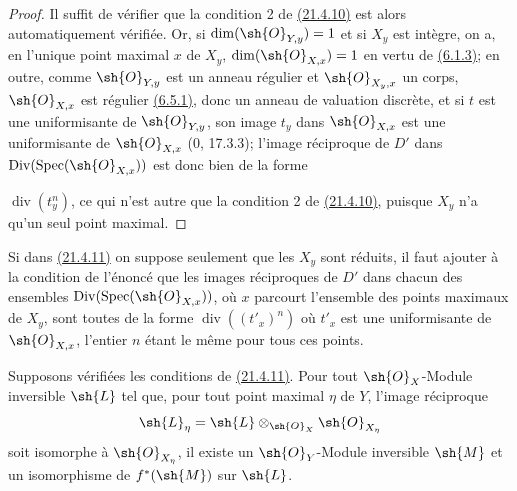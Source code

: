 \begin{proof}
Il suffit de vérifier que la condition 2\textdegree{} de
{\hyperlink{ega4.c04.cor.21-4-10}{(21.4.10)}} est alors
automatiquement vérifiée. Or, si $\dim(\sh{O}_{Y,y})=1$ et si $X_y$ est
intègre, on a, en l'unique point maximal $x$ de $X_y$,
$\dim(\sh{O}_{X,x})=1$ en vertu de
{\hyperlink{ega4.c04.cor.6-1-3}{(6.1.3)}}; en outre, comme
$\sh{O}_{Y,y}$ est un anneau régulier et $\sh{O}_{X_y,x}$ un corps,
$\sh{O}_{X,x}$ est régulier
{\hyperlink{ega4.c04.prop.6-5-1}{(6.5.1)}}, donc un anneau de valuation
discrète, et si $t$ est une uniformisante de $\sh{O}_{Y,y}$, son image
$t_y$ dans $\sh{O}_{X,x}$ est une uniformisante de $\sh{O}_{X,x}$
($0$, 17.3.3); l'image réciproque de $D'$ dans
$\operatorname{Div}(\operatorname{Spec}(\sh{O}_{X,x}))$ est donc bien
de la forme

$\operatorname{div}(t_y^n)$, ce qui n'est autre que la condition
2\textdegree{} de {\hyperlink{ega4.c04.cor.21-4-10}{(21.4.10)}},
puisque $X_y$ n'a qu'un seul point maximal.
\end{proof}

\begin{remark}[21.4.12]
\label{IV.21.4.12}
Si dans {\hyperlink{ega4.c04.cor.21-4-11}{(21.4.11)}} on suppose
seulement que les $X_y$ sont réduits, il faut ajouter à la condition de
l'énoncé que les images réciproques de $D'$ dans chacun des ensembles
$\operatorname{Div}(\operatorname{Spec}(\sh{O}_{X,x}))$, où $x$
parcourt l'ensemble des points maximaux de $X_y$, sont toutes de la
forme $\operatorname{div}((t'_x)^n)$ où $t'_x$ est une uniformisante
de $\sh{O}_{X,x}$, l'entier $n$ étant le même pour tous ces points.
\end{remark}

\begin{corollary}[21.4.13]
\label{IV.21.4.13}
Supposons vérifiées les conditions de
{\hyperlink{ega4.c04.cor.21-4-11}{(21.4.11)}}. Pour tout
$\sh{O}_X$-Module inversible $\sh{L}$ tel que, pour tout point maximal
$\eta$ de $Y$, l'image réciproque
\[
 \sh{L}_\eta=\sh{L}\otimes_{\sh{O}_X}\sh{O}_{X_\eta}
\]
soit isomorphe à $\sh{O}_{X_\eta}$, il existe un
$\sh{O}_Y$-Module inversible $\sh{M}$ et un isomorphisme de
$f^*(\sh{M})$ sur $\sh{L}$.
\end{corollary}

